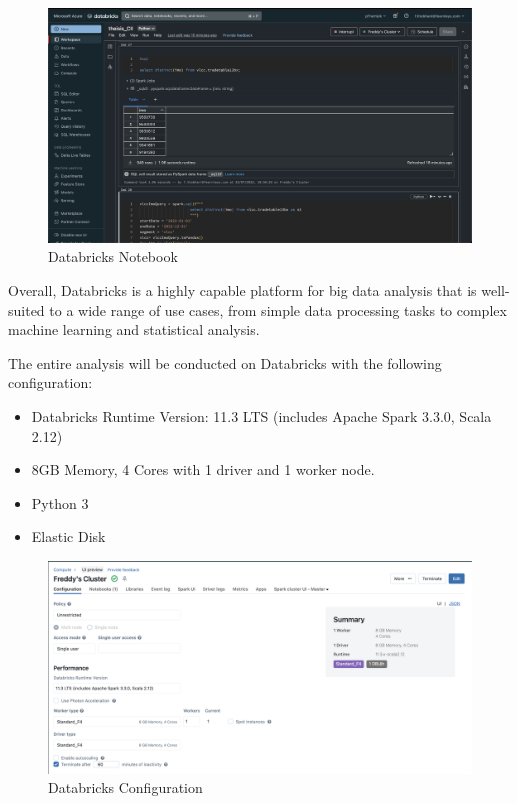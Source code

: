 \begin{figure}[ht]
    \centering
    \includegraphics[width=1\textwidth]{images/databricks_notebook.png}
    \caption{Databricks Notebook}
    \label{databricks_notebook}
\end{figure}

Overall, Databricks is a highly capable platform for big data analysis that is well-suited to a wide range of use cases, from simple data processing tasks to complex machine learning and statistical analysis.

The entire analysis will be conducted on Databricks with the following configuration:

\begin{itemize}
    \item Databricks Runtime Version: 11.3 LTS (includes Apache Spark 3.3.0, Scala 2.12)
    \item 8GB Memory, 4 Cores with 1 driver and 1 worker node.
    \item Python 3
    \item Elastic Disk
\end{itemize}

\begin{figure}[ht]
    \centering
    \includegraphics[width=1\textwidth]{images/databricks_configuration.png}
    \caption{Databricks Configuration}
    \label{databricks_configuration}
\end{figure}


